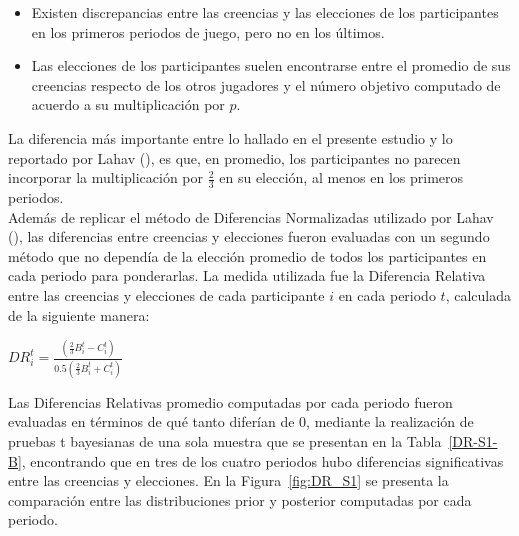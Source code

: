 \begin{itemize}
\item Existen discrepancias entre las creencias y las elecciones de los participantes en los primeros periodos de juego, pero no en los últimos.\\

\item Las elecciones de los participantes suelen encontrarse entre el promedio de sus creencias respecto de los otros jugadores y el número objetivo computado de acuerdo a su multiplicación por $p$.\\
\end{itemize}

La diferencia más importante entre lo hallado en el presente estudio y lo reportado por Lahav (\citeyear{Lahav}), es que, en promedio, los participantes no parecen incorporar la multiplicación por $\frac{2}{3}$ en su elección, al menos en los primeros periodos.\\

Además de replicar el método de Diferencias Normalizadas utilizado por Lahav (\citeyear{Lahav}), las diferencias entre creencias y elecciones fueron evaluadas con un segundo método que no dependía de la elección promedio de todos los participantes en cada periodo para ponderarlas. La medida utilizada fue la Diferencia Relativa entre las creencias y elecciones de cada participante $i$ en cada periodo $t$, calculada de la siguiente manera:\\

\begin{center}
$DR_i^t =  \frac{(\frac{2}{3}B_i^t- C_i^t)}{0.5(\frac{2}{3}B_i^t + C_i^t)}$\\
\end{center}

Las Diferencias Relativas promedio computadas por cada periodo fueron evaluadas en términos de qué tanto diferían de 0, mediante la realización de pruebas t bayesianas de una sola muestra que se presentan en la Tabla~\ref{DR-S1-B}, encontrando que en tres de los cuatro periodos hubo diferencias significativas entre las creencias y elecciones. En la Figura~\ref{fig:DR_S1} se presenta la comparación entre las distribuciones prior y posterior computadas por cada periodo.\\


